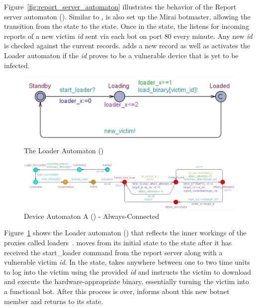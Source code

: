 \par
Figure~\ref{fig:report_server_automaton} illustrates the behavior of the Report server automaton (\RPT). Similar to \CNC, \RPT is also set up the Mirai botmaster, allowing the transition from the  state to the  state. Once in the  state, the \RPT listens for incoming reports of a new victim \emph{id} sent via each bot on port 80 every minute. Any new \emph{id} is checked against the current records. \LDR adds a new record as well as activates the Loader automaton if the \emph{id} proves to be a vulnerable device that is yet to be infected.
\begin{figure}[h!]
    \centering
    \includegraphics[width=.8\linewidth]{Figures/Loader_automaton.jpg}
    \caption{The Loader Automaton (\LDR)}
    \vspace{-0.1 cm}
    \label{fig:loader_automaton}
\end{figure}
\par
\begin{figure}[t!]
    \centering
    \includegraphics[width=\linewidth]{Figures/Device_t1_automaton.jpg}
    \caption{Device Automaton A (\DA) - Always-Connected}
    \vspace{-0.1 cm}
    \label{fig:device_type_a}
\end{figure}
\par
Figure~\ref{fig:loader_automaton} shows the Loader automaton (\LDR) that reflects the inner workings of the proxies called loaders~\cite{kambourakis2017mirai}. \LDR moves from its initial  state to the  state after it has received the start\_loader command from the report server along with a vulnerable victim \emph{id}. In the  state, \LDR takes anywhere between one to two time units to log into the victim using the provided \emph{id} and instructs the victim to download and execute the hardware-appropriate binary, essentially turning the victim into a functional bot. After this process is over, \LDR informs \CNC about this new botnet member and returns to its  state.



